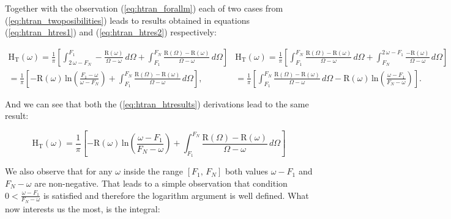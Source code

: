 \documentclass[12pt,twoside,a4paper]{article}
\numberwithin{equation}{subsection}
\numberwithin{figure}{subsection}
\begin{document}
Together with the observation (\ref{eq:htran_forallm}) each of two cases from (\ref{eq:htran_twoposibilities}) leads to results obtained in equations (\ref{eq:htran_htres1}) and (\ref{eq:htran_htres2}) respectively:

\begin{subequations} \label{eq:htran_htresults}
  \begin{multline}   \label{eq:htran_htres1}
    \mathrm{H_T}(\omega )= \frac {1}{\pi} 
    \left[
        \int_{2\,\omega - F_N}^{F_1} - \frac {\mathrm{R}(\omega )}{\Omega - \omega }\,d\Omega 
      + \int_{F_1}^{F_N} \frac {\mathrm{R}(\Omega ) - \mathrm{R}(\omega )}{\Omega - \omega }\,d\Omega 
    \right] \\
    = \frac {1}{\pi} 
    \left[ 
      - \mathrm{R}(\omega )\,\mathrm{ln}(\frac {F_1 - \omega }{\omega - F_N}) 
      + \int_{F_1}^{F_N}\frac {\mathrm{R}( \Omega ) - \mathrm{R}(\omega )}{\Omega  - \omega }\,d\Omega  
    \right] ,
  \end{multline}
  \begin{multline}   \label{eq:htran_htres2}
    \mathrm{H_T}(\omega ) = \frac {1}{\pi} 
    \left[
        \int_{F_1}^{F_N}\frac {\mathrm{R}(\Omega )- \mathrm{R}(\omega)}{\Omega - \omega }\,d\Omega 
      + \int_{F_N}^{2\,\omega - F_1}\frac { - \mathrm{R}(\omega )}{\Omega  - \omega }\,d\Omega
    \right] \\
    = \frac {1}{\pi} 
    \left[ 
        \int_{F_1}^{F_N}\frac {\mathrm{R}(\Omega ) - \mathrm{R}(\omega )}{\Omega  - \omega }\,d\Omega 
      - \mathrm{R}( \omega )\,\mathrm{ln}(\frac {\omega - F_1}{F_N - \omega })
    \right] .
  \end{multline}
\end{subequations}

And we can see that both the (\ref{eq:htran_htresults}) derivations lead to the same result:

\begin{equation} \label{eq:htran_sameresult}
  \mathrm{H_T}(\omega ) = \frac {1}{\pi } 
  \left[
      - \mathrm{R}(\omega )\, \mathrm{ln}( \frac {\omega  - F_1}{F_N - \omega }) 
      + \int_{F_1}^{ F_N}\frac {\mathrm{R}(\Omega ) - \mathrm{R}(\omega )}{\Omega - \omega }\,d\Omega
  \right] 
\end{equation}

We also observe that for any $\omega$ inside the range $[F_1, \,F_N] $ both values $\omega  - F_1$ and $F_N - \omega$ are non-negative. That leads to a simple observation that condition $0 < \frac {\omega - F_1}{F_N - \omega }$ is satisfied and therefore the logarithm argument is well defined. What now interests us the most, is the integral:
\end{document}
